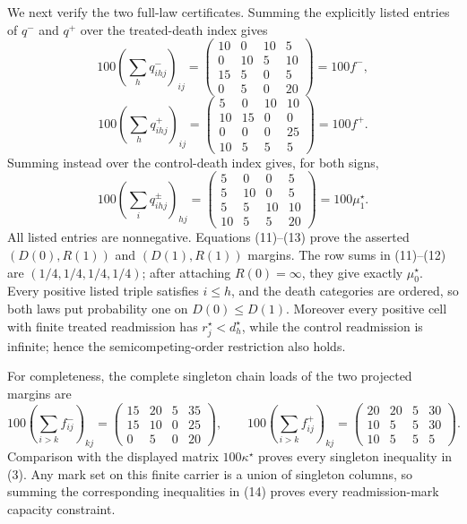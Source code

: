 We next verify the two full-law certificates.  Summing the explicitly listed entries of \(q^-\) and \(q^+\) over the treated-death index gives
\[
100\left(\sum_hq^-_{ihj}\right)_{ij}
=
\begin{pmatrix}
10&0&10&5\\
0&10&5&10\\
15&5&0&5\\
0&5&0&20
\end{pmatrix}
=100f^-,
\tag{11}
\]
\[
100\left(\sum_hq^+_{ihj}\right)_{ij}
=
\begin{pmatrix}
5&0&10&10\\
10&15&0&0\\
0&0&0&25\\
10&5&5&5
\end{pmatrix}
=100f^+.
\tag{12}
\]
Summing instead over the control-death index gives, for both signs,
\[
100\left(\sum_iq^\pm_{ihj}\right)_{hj}
=
\begin{pmatrix}
5&0&0&5\\
5&10&0&5\\
5&5&10&10\\
10&5&5&20
\end{pmatrix}
=100\mu_1^\star. \tag{13}
\]
All listed entries are nonnegative.  Equations (11)--(13) prove the asserted \((D(0),R(1))\) and \((D(1),R(1))\) margins.  The row sums in (11)--(12) are \((1/4,1/4,1/4,1/4)\); after attaching \(R(0)=\infty\), they give exactly \(\mu_0^\star\).  Every positive listed triple satisfies \(i\leq h\), and the death categories are ordered, so both laws put probability one on \(D(0)\leq D(1)\).  Moreover every positive cell with finite treated readmission has \(r_j^\star<d_h^\star\), while the control readmission is infinite; hence the semicompeting-order restriction also holds.

For completeness, the complete singleton chain loads of the two projected margins are
\[
100\left(\sum_{i>k}f^-_{ij}\right)_{kj}
=
\begin{pmatrix}
15&20&5&35\\
15&10&0&25\\
0&5&0&20
\end{pmatrix},
\qquad
100\left(\sum_{i>k}f^+_{ij}\right)_{kj}
=
\begin{pmatrix}
20&20&5&30\\
10&5&5&30\\
10&5&5&5
\end{pmatrix}. \tag{14}
\]
Comparison with the displayed matrix \(100\kappa^\star\) proves every singleton inequality in (3).  Any mark set on this finite carrier is a union of singleton columns, so summing the corresponding inequalities in (14) proves every readmission-mark capacity constraint.

